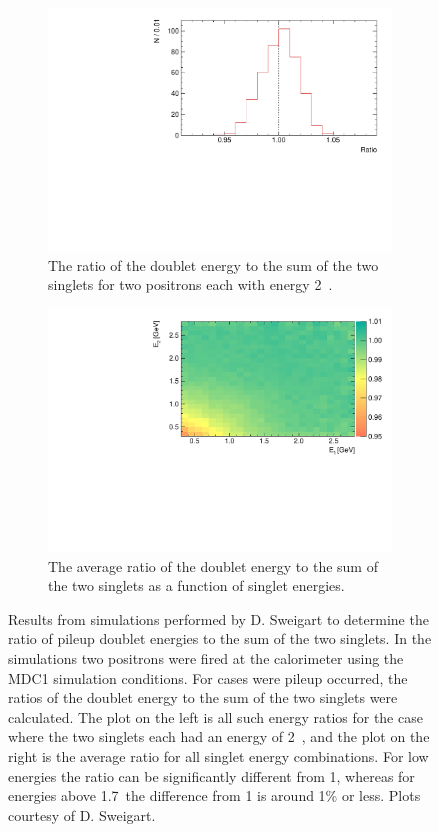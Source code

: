 \begin{figure}[h]
\centering
    \begin{subfigure}[t]{0.45\textwidth}
        \centering
        \includegraphics[width=\textwidth]{p_ratio_2_2_hist}
        \caption{The ratio of the doublet energy to the sum of the two singlets for two positrons each with energy 2~\GeV.}
    \end{subfigure}%
    \hspace{1cm}
    \begin{subfigure}[t]{0.45\textwidth}
        \centering
        \includegraphics[width=\textwidth]{p_ratio_e1_e2}
        \caption{The average ratio of the doublet energy to the sum of the two singlets as a function of singlet energies.}
    \end{subfigure}
\caption[]{Results from simulations performed by D. Sweigart to determine the ratio of pileup doublet energies to the sum of the two singlets. In the simulations two positrons were fired at the calorimeter using the MDC1 simulation conditions. For cases were pileup occurred, the ratios of the doublet energy to the sum of the two singlets were calculated. The plot on the left is all such energy ratios for the case where the two singlets each had an energy of 2~\GeV, and the plot on the right is the average ratio for all singlet energy combinations. For low energies the ratio can be significantly different from 1, whereas for energies above 1.7~\GeV the difference from 1 is around 1\% or less. Plots courtesy of D. Sweigart.}

\end{figure}
